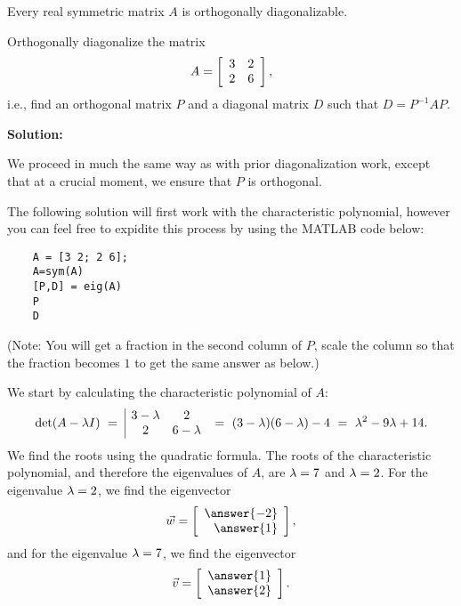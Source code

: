 \documentclass{ximera}
\begin{document}
\begin{theorem}\label{th:diagonalization-symmetric}
  Every real symmetric matrix $A$ is orthogonally diagonalizable.
\end{theorem}

\begin{example}\label{ex:diagonalization-symmetric}

  Orthogonally diagonalize the matrix
  \begin{equation*}
    A = \startmat{rr}
      3 & 2 \\
      2 & 6 \\
    \stopmat,
  \end{equation*}
  i.e., find an orthogonal matrix $P$ and a diagonal matrix $D$ such
  that $D = P^{-1}AP$.

  \textbf{Solution:}

  We proceed in much the same way as with prior diagonalization work,
  except that at a crucial moment, we ensure that $P$ is orthogonal.

  The following solution will first work with the characteristic polynomial, however you can feel free to expidite this process by using the MATLAB code below:

  \begin{verbatim}
    A = [3 2; 2 6];
    A=sym(A)
    [P,D] = eig(A)
    P
    D
  \end{verbatim}

  (Note: You will get a fraction in the second column of $P$, scale the column so that the fraction becomes $1$ to get the same answer as below.)

  We start by calculating the characteristic polynomial of $A$:
  \begin{equation*}
    \det(A-\eigenvar I)
    ~=~ \begin{array}{|ccc|}
      3-\eigenvar & 2 \\
      2 & 6-\eigenvar
    \end{array}
    ~=~ (3-\eigenvar)(6-\eigenvar) - 4
    ~=~ \eigenvar^2 - 9\eigenvar + 14.
  \end{equation*}
  We find the roots using the quadratic formula. The roots of the
  characteristic polynomial, and therefore the eigenvalues of $A$, are
  $\eigenvar=7$ and $\eigenvar=2$. For the eigenvalue $\eigenvar=2$, we find the eigenvector
  \begin{equation*}
    \vect{w} = \startmat{r} \answer{-2} \\ \answer{1} \stopmat,
  \end{equation*}
  and for the eigenvalue $\eigenvar=7$,
  we find the eigenvector
  \begin{equation*}
    \vect{v} = \startmat{r} \answer{1} \\ \answer{2} \stopmat.
  \end{equation*} 


\end{example}
\end{document}
